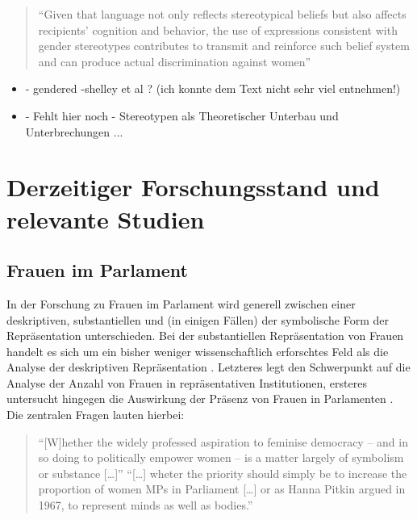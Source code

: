 \documentclass[12pt, 
    twoside=false, 
    bibliography=totoc, 
    numbers=endperiod, 
    headings=normal, 
    toc=chapterentrydotfill
    ]{scrbook}
\begin{document}
\begin{quote}
    \enquote{Given that language not only reflects stereotypical beliefs but also affects recipients’ cognition and behavior, the use of expressions consistent with gender stereotypes contributes to transmit and reinforce such belief system and can produce actual discrimination against women} \parencite[2]{menegatti_2017}
\end{quote}

\begin{itemize}
    \item - gendered -shelley et al ? (ich konnte dem Text nicht sehr viel entnehmen!) 
    \item - Fehlt hier noch - Stereotypen als Theoretischer Unterbau und Unterbrechungen ...
\end{itemize}



\section {Derzeitiger Forschungsstand und relevante Studien }

\subsection{Frauen im Parlament}

In der Forschung zu Frauen im Parlament wird generell zwischen einer deskriptiven, substantiellen und (in einigen Fällen) der symbolische Form der Repräsentation unterschieden. Bei der substantiellen Repräsentation von Frauen handelt es sich um ein bisher weniger wissenschaftlich erforschtes Feld als die Analyse der deskriptiven Repräsentation \parencite[59]{wangnerud_2009}. 
Letzteres legt den Schwerpunkt auf die Analyse der Anzahl von Frauen in repräsentativen Institutionen, ersteres untersucht hingegen die Auswirkung der Präsenz von Frauen in Parlamenten \parencites[14]{coffe_2013}[52]{wangnerud_2009}.
Die zentralen Fragen lauten hierbei:

\begin{quote}
  \enquote{[W]hether the widely professed aspiration to feminise democracy -- and in so doing to politically empower women -- is a matter largely of symbolism or substance […]}
  \enquote{[…] wheter the priority should simply be to increase the proportion of women MPs in Parliament […] or as Hanna Pitkin argued in 1967, to represent minds as well as bodies.}
  \parencite[413]{blaxill_2016}
\end{quote}
\end{document}
